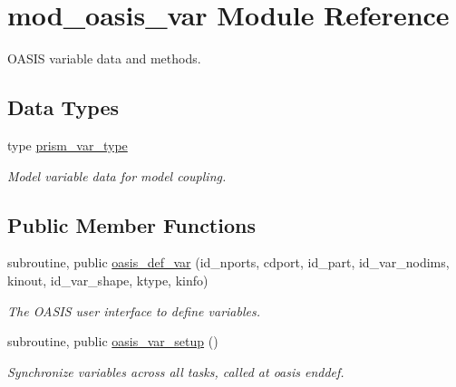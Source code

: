 \hypertarget{classmod__oasis__var}{\section{mod\+\_\+oasis\+\_\+var Module Reference}
\label{classmod__oasis__var}
}


O\+A\+S\+I\+S variable data and methods.  


\subsection*{Data Types}
\begin{DoxyCompactItemize}
\item 
type \hyperlink{structmod__oasis__var_1_1prism__var__type}{prism\+\_\+var\+\_\+type}
\begin{DoxyCompactList}\small\item\em Model variable data for model coupling. \end{DoxyCompactList}\end{DoxyCompactItemize}
\subsection*{Public Member Functions}
\begin{DoxyCompactItemize}
\item 
subroutine, public \hyperlink{classmod__oasis__var_a7d16403015304fadc15624773f87d2a0}{oasis\+\_\+def\+\_\+var} (id\+\_\+nports, cdport, id\+\_\+part, id\+\_\+var\+\_\+nodims, kinout, id\+\_\+var\+\_\+shape, ktype, kinfo)
\begin{DoxyCompactList}\small\item\em The O\+A\+S\+I\+S user interface to define variables. \end{DoxyCompactList}\item 
subroutine, public \hyperlink{classmod__oasis__var_ab33b7fbec62bcfd15e9cd7f912f71035}{oasis\+\_\+var\+\_\+setup} ()
\begin{DoxyCompactList}\small\item\em Synchronize variables across all tasks, called at oasis enddef. \end{DoxyCompactList}\end{DoxyCompactItemize}
